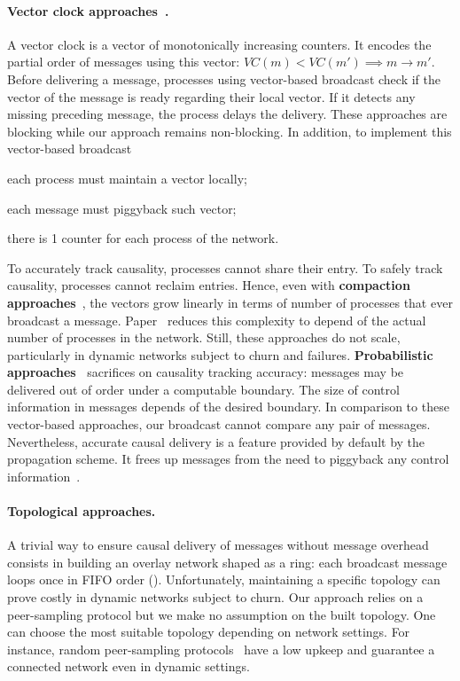 \paragraph{Vector clock
  approaches~\cite{fidge1988timestamps,mattern1989virtual}.} A vector clock is a
vector of monotonically increasing counters.  It encodes the partial order of
messages using this vector: $VC(m) < VC(m') \implies m \rightarrow m'$.  Before
delivering a message, processes using vector-based broadcast check if the vector
of the message is ready regarding their local vector. If it detects any missing
preceding message, the process delays the delivery. These approaches are
blocking while our approach remains non-blocking.  In addition, to implement
this vector-based broadcast
\begin{inparaenum}[(i)]
\item each process must maintain a vector locally;
\item each message must piggyback such vector;
\item there is 1 counter for each process of the network.
\end{inparaenum}
To accurately track causality, processes cannot share their entry. To safely
track causality, processes cannot reclaim entries. Hence, even with
\textbf{compaction approaches}~\cite{singhal1992efficient}, the vectors grow
linearly in terms of number of processes that ever broadcast a message.
Paper~\cite{almeida2008interval} reduces this complexity to depend of the actual
number of processes in the network. Still, these approaches do not scale,
particularly in dynamic networks subject to churn and
failures. \textbf{Probabilistic approaches~\cite{mostefaoui2017probabilistic}}
sacrifices on causality tracking accuracy: messages may be delivered out of
order under a computable boundary. The size of control information in messages
depends of the desired boundary. In comparison to these vector-based approaches,
our broadcast cannot compare any pair of messages. Nevertheless, accurate causal
delivery is a feature provided by default by the propagation scheme. It frees up
messages from the need to piggyback any control
information~\cite{friedman2004causal}.

\paragraph{Topological approaches.} A trivial way to ensure causal delivery of
messages without message overhead consists in building an overlay network shaped
as a ring: each broadcast message loops once in FIFO order (\REF).
Unfortunately, maintaining a specific topology can prove costly in dynamic
networks subject to churn. Our approach relies on a peer-sampling protocol
 but we make no assumption
on the built topology. One can choose the most suitable topology depending on
network settings. For instance, random peer-sampling
protocols~\cite{jelasity2007gossip} have a low upkeep and guarantee a connected
network even in dynamic settings.

